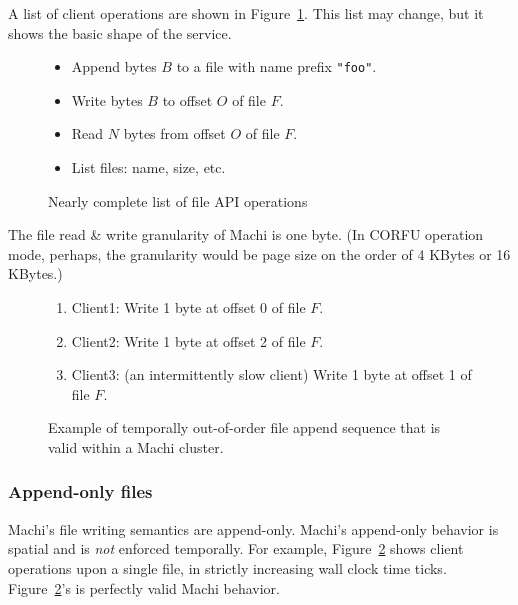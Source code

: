 \documentclass[preprint,10pt]{sigplanconf}
\begin{document}
A list of client operations are shown in
Figure~\ref{fig:example-client-API}.  This list may change, but it
shows the basic shape of the service.

\begin{figure}
\begin{itemize}
        \item Append bytes $B$ to a file with name prefix {\tt "foo"}.
        \item Write bytes $B$ to offset $O$ of file $F$.
        \item Read $N$ bytes from offset $O$ of file $F$.
        \item List files: name, size, etc.
\end{itemize}
\caption{Nearly complete list of file API operations}
\label{fig:example-client-API}
\end{figure}

The file read \& write granularity of Machi is one byte.  (In CORFU
operation mode, perhaps, the granularity would be page size on the
order of 4 KBytes or 16 KBytes.)

\begin{figure}
    \begin{enumerate}
        \item Client1: Write 1 byte at offset 0 of file $F$.
        \item Client2: Write 1 byte at offset 2 of file $F$.
        \item Client3: (an intermittently slow client) Write 1 byte at offset 1 of file $F$.
    \end{enumerate}
\caption{Example of temporally out-of-order file append sequence that
  is valid within a Machi cluster.}
\label{fig:temporal-out-of-order}
\end{figure}

\subsubsection{Append-only files}
\label{sub:assume-append-only}

Machi's file writing semantics are append-only.  
Machi's append-only behavior is spatial and is {\em not}
enforced temporally.  For example, Figure~\ref{fig:temporal-out-of-order}
shows client operations
upon a single file, in strictly increasing wall clock time ticks.
Figure~\ref{fig:temporal-out-of-order}'s is perfectly valid Machi behavior.
\end{document}
